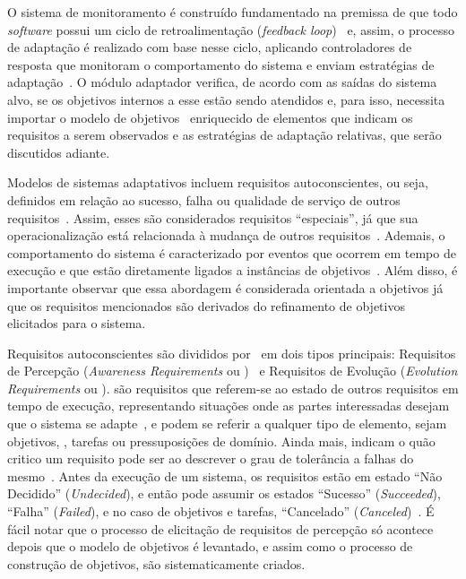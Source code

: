 O sistema de monitoramento é construído fundamentado na premissa de que todo \textit{software} possui um ciclo de retroalimentação (\textit{feedback loop})~\cite{brun2009engineering} e, assim, o processo de adaptação é realizado com base nesse ciclo, aplicando controladores de resposta que monitoram o comportamento do sistema e enviam estratégias de adaptação~\cite{souza2013awareness}. O módulo adaptador verifica, de acordo com as saídas do sistema alvo, se os objetivos internos a esse estão sendo atendidos e, para isso, necessita importar o modelo de objetivos~\cite{souza2013awareness} enriquecido de elementos que indicam os requisitos a serem observados e as estratégias de adaptação relativas, que serão discutidos adiante.

Modelos de sistemas adaptativos incluem requisitos autoconscientes, ou seja, definidos em relação ao sucesso, falha ou qualidade de serviço de outros requisitos~\cite{souza2013awareness}. Assim, esses são considerados requisitos ``especiais'', já que sua operacionalização está relacionada à mudança de outros requisitos~\cite{souza2012requirement}. Ademais, o comportamento do sistema é caracterizado por eventos que ocorrem em tempo de execução e que estão diretamente ligados a instâncias de objetivos~\cite{dalpiaz2013runtime}. Além disso, é importante observar que essa abordagem é considerada orientada a objetivos já que os requisitos mencionados são derivados do refinamento de objetivos elicitados para o sistema.

Requisitos autoconscientes são divididos por~ em dois tipos principais: Requisitos de Percepção (\textit{Awareness Requirements} ou \awreqs)~\cite{souza2013awareness} e Requisitos de Evolução (\textit{Evolution Requirements} ou \evoreqs). \awreqs são requisitos que referem-se ao estado de outros requisitos em tempo de execução, representando situações onde as partes interessadas desejam que o sistema se adapte~\cite{souza2012requirement}, e podem se referir a qualquer tipo de elemento, sejam objetivos, \sofgoals, tarefas ou pressuposições de domínio. Ainda mais, \awreqs indicam o quão critico um requisito pode ser ao descrever o grau de tolerância a falhas do mesmo~\cite{souza2012requirement}. Antes da execução de um sistema, os requisitos estão em estado ``Não Decidido'' (\textit{Undecided}), e então pode assumir os estados ``Sucesso'' (\textit{Succeeded}), ``Falha'' (\textit{Failed}), e no caso de objetivos e tarefas, ``Cancelado'' (\textit{Canceled})~\cite{souza2013awareness}. É fácil notar que o processo de elicitação de requisitos de percepção só acontece depois que o modelo de objetivos é levantado, e assim como o processo de construção de objetivos, \awreqs são sistematicamente criados.

